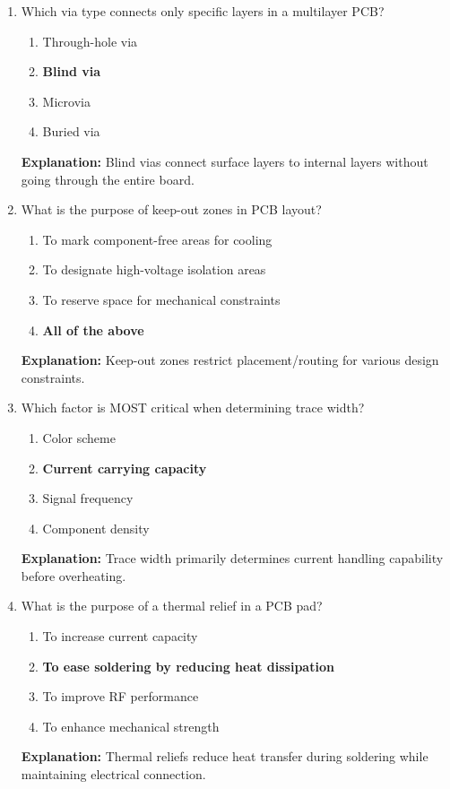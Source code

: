 \documentclass{article}
\begin{document}
\begin{enumerate}
		\item Which via type connects only specific layers in a multilayer PCB?
		\begin{enumerate}
			\item Through-hole via
			\item \textbf{Blind via}
			\item Microvia
			\item Buried via
		\end{enumerate}
		\textbf{Explanation:} Blind vias connect surface layers to internal layers without going through the entire board.
		
		\item What is the purpose of keep-out zones in PCB layout?
		\begin{enumerate}
			\item To mark component-free areas for cooling
			\item To designate high-voltage isolation areas
			\item To reserve space for mechanical constraints
			\item \textbf{All of the above}
		\end{enumerate}
		\textbf{Explanation:} Keep-out zones restrict placement/routing for various design constraints.
		
		\item Which factor is MOST critical when determining trace width?
		\begin{enumerate}
			\item Color scheme
			\item \textbf{Current carrying capacity}
			\item Signal frequency
			\item Component density
		\end{enumerate}
		\textbf{Explanation:} Trace width primarily determines current handling capability before overheating.
		
		\item What is the purpose of a thermal relief in a PCB pad?
		\begin{enumerate}
			\item To increase current capacity
			\item \textbf{To ease soldering by reducing heat dissipation}
			\item To improve RF performance
			\item To enhance mechanical strength
		\end{enumerate}
		\textbf{Explanation:} Thermal reliefs reduce heat transfer during soldering while maintaining electrical connection.
	\end{enumerate}
	
\end{document}
